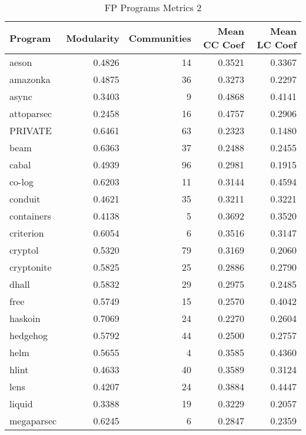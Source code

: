 \documentclass[12pt, a4paper]{article}
\begin{document}
\begin{longtable}[H]{l r r r r}
    \caption{FP Programs Metrics 2}\label{table:fp_metrics_2}\\
        Program & Modularity & Communities & Mean CC Coef & Mean LC Coef \\
        \hline            
        \endhead
        aeson      &  0.4826  &  14  &  0.3521 &  0.3367 \\      
        amazonka   &  0.4875  &  36  &  0.3273 &  0.2297 \\      
        async      &  0.3403  &   9  &  0.4868 &  0.4141 \\      
        attoparsec &  0.2458  &  16  &  0.4757 &  0.2906 \\      
        PRIVATE    &   0.6461 &   63 &   0.2323 &  0.1480 \\      
        beam       &  0.6363  &  37  &  0.2488 &  0.2455 \\      
        cabal      &  0.4939  &  96  &  0.2981 &  0.1915 \\      
        co-log     &  0.6203  &  11  &  0.3144 &  0.4594 \\      
        conduit    &  0.4621  &  35  &  0.3211 &  0.3221 \\      
        containers &  0.4138  &   5  &  0.3692 &  0.3520 \\      
        criterion  &  0.6054  &   6  &  0.3516 &  0.3147 \\      
        cryptol    &  0.5320  &  79  &  0.3169 &  0.2060 \\      
        cryptonite &  0.5825  &  25  &  0.2886 &  0.2790 \\      
        dhall      &  0.5832  &  29  &  0.2975 &  0.2485 \\      
        free       &  0.5749  &  15  &  0.2570 &  0.4042 \\      
        haskoin    &  0.7069  &  24  &  0.2270 &  0.2604 \\      
        hedgehog   &  0.5792  &  44  &  0.2500 &  0.2757 \\      
        helm       &  0.5655  &   4  &  0.3585 &  0.4360 \\      
        hlint      &  0.4633  &  40  &  0.3589 &  0.3124 \\      
        lens       &  0.4207  &  24  &  0.3884 &  0.4447 \\      
        liquid     &  0.3388  &  19  &  0.3229 &  0.2057 \\      
        megaparsec &  0.6245  &   6  &  0.2847 &  0.2359 \\      

\end{longtable}
\end{document}

